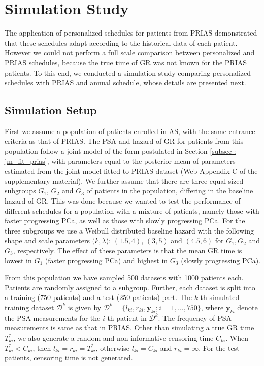 \section{Simulation Study}
\label{sec: simulation_study}
The application of personalized schedules for patients from PRIAS demonstrated that these schedules adapt according to the historical data of each patient. However we could not perform a full scale comparison between personalized and PRIAS schedules, because the true time of GR was not known for the PRIAS patients. To this end, we conducted a simulation study comparing personalized schedules with PRIAS and annual schedule, whose details are presented next.

\subsection{Simulation Setup}
\label{subsec : simulation_setup}
First we assume a population of patients enrolled in AS, with the same entrance criteria as that of PRIAS. The PSA and hazard of GR for patients from this population follow a joint model of the form postulated in Section \ref{subsec : jm_fit_prias}, with parameters equal to the posterior mean of parameters estimated from the joint model fitted to PRIAS dataset (Web Appendix C of the supplementary material). We further assume that there are three equal sized subgroups $G_1$, $G_2$ and $G_3$ of patients in the population, differing in the baseline hazard of GR. This was done because we wanted to test the performance of different schedules for a population with a mixture of patients, namely those with faster progressing PCa, as well as those with slowly progressing PCa. For the three subgroups we use a Weibull distributed baseline hazard with the following shape and scale parameters $(k, \lambda$): $(1.5, 4)$, $(3, 5)$ and $(4.5, 6)$ for $G_1, G_2$ and $G_3$, respectively. The effect of these parameters is that the mean GR time is lowest in $G_1$ (faster progressing PCa) and highest in $G_3$ (slowly progressing PCa).

From this population we have sampled 500 datasets with 1000 patients each. Patients are randomly assigned to a subgroup. Further, each dataset is split into a training (750 patients) and a test (250 patients) part. The $k$-th simulated training dataset $\mathcal{D}^k$ is given by $\mathcal{D}^k = \{l_{ki}, r_{ki}, \boldsymbol{y}_{ki}; i = 1, \ldots, 750\}$, where $\boldsymbol{y}_{ki}$ denote the PSA measurements for the $i$-th patient in $\mathcal{D}^k$. The frequency of PSA measurements is same as that in PRIAS. Other than simulating a true GR time $T^*_{ki}$, we also generate a random and non-informative censoring time $C_{ki}$. When $T^*_{ki} < C_{ki}$, then $l_{ki} = r_{ki} = T^*_{ki}$, otherwise $l_{ki} = C_{ki}$ and $r_{ki} = \infty$. For the test patients, censoring time is not generated.

